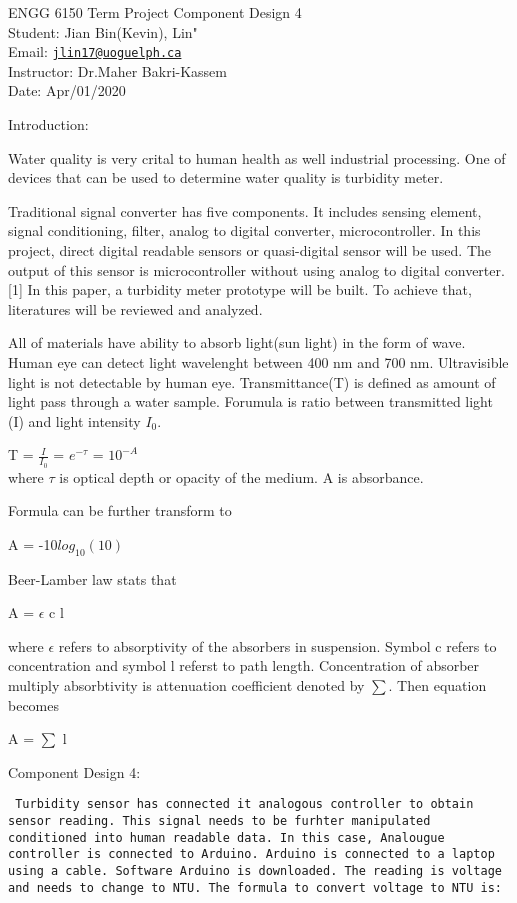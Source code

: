 \documentclass[]{article}
\title{}
\author{}
\date{}
\begin{document}
ENGG 6150 Term Project Component Design 4\\
Student: Jian Bin(Kevin), Lin"\\
Email:
\href{mailto:jlin17@uoguelph.ca}{\nolinkurl{jlin17@uoguelph.ca}}\\
Instructor: Dr.Maher Bakri-Kassem\\
Date: Apr/01/2020

\newpage  

Introduction:

Water quality is very crital to human health as well industrial
processing. One of devices that can be used to determine water quality
is turbidity meter.

Traditional signal converter has five components. It includes sensing
element, signal conditioning, filter, analog to digital converter,
microcontroller. In this project, direct digital readable sensors or
quasi-digital sensor will be used. The output of this sensor is
microcontroller without using analog to digital converter. {[}1{]} In
this paper, a turbidity meter prototype will be built. To achieve that,
literatures will be reviewed and analyzed.

All of materials have ability to absorb light(sun light) in the form of
wave. Human eye can detect light wavelenght between 400 nm and 700 nm.
Ultravisible light is not detectable by human eye. Transmittance(T) is
defined as amount of light pass through a water sample. Forumula is
ratio between transmitted light (I) and light intensity \(I_0\).

T = \(\frac{I}{I_0}\) = \(e^{-\tau}\) = \(10^{-A}\)\\
where \(\tau\) is optical depth or opacity of the medium. A is
absorbance.

Formula can be further transform to

A = -10\(log_{10}(10)\)

Beer-Lamber law stats that

A = \(\epsilon\) c l

where \(\epsilon\) refers to absorptivity of the absorbers in
suspension. Symbol c refers to concentration and symbol l referst to
path length. Concentration of absorber multiply absorbtivity is
attenuation coefficient denoted by \(\sum\). Then equation becomes

A = \(\sum\) l

Component Design 4:

\begin{verbatim}
 Turbidity sensor has connected it analogous controller to obtain sensor reading. This signal needs to be furhter manipulated conditioned into human readable data. In this case, Analougue controller is connected to Arduino. Arduino is connected to a laptop using a cable. Software Arduino is downloaded. The reading is voltage and needs to change to NTU. The formula to convert voltage to NTU is: 
 
\end{verbatim}
\end{document}
